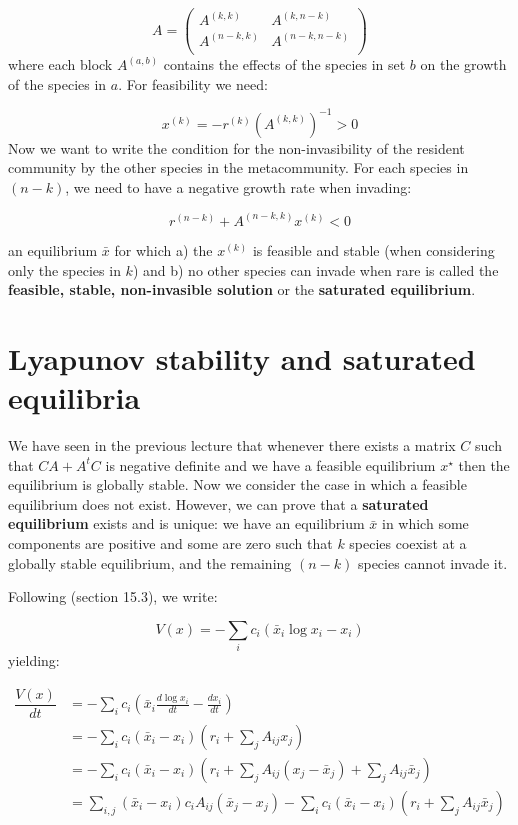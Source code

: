 \documentclass[
]{book}
\begin{document}
\[
A = \begin{pmatrix}
A^{(k,k)} & A^{(k, n- k)}\\
A^{(n-k,k)} & A^{(n-k, n- k)}\\
  \end{pmatrix}
\]
where each block \(A^{(a,b)}\) contains the effects of the species in set \(b\) on the growth of the species in \(a\). For feasibility we need:

\[
x^{(k)} = -r^{(k)}\left(A^{(k,k)} \right)^{-1} > 0
\]
Now we want to write the condition for the non-invasibility of the resident community by the other species in the metacommunity. For each species in \((n-k)\), we need to have a negative growth rate when invading:

\[
r^{(n-k)} + A^{(n-k,k)}x^{(k)} < 0
\]

an equilibrium \(\bar{x}\) for which a) the \(x^{(k)}\) is feasible and stable (when considering only the species in \(k\)) and b) no other species can invade when rare is called the \textbf{feasible, stable, non-invasible solution} or the \textbf{saturated equilibrium}.

\hypertarget{lyapunov-stability-and-saturated-equilibria}{%
\section{Lyapunov stability and saturated equilibria}\label{lyapunov-stability-and-saturated-equilibria}}

We have seen in the previous lecture that whenever there exists a matrix \(C\) such that \(CA + A^t C\) is negative definite and we have a feasible equilibrium \(x^\star\) then the equilibrium is globally stable. Now we consider the case in which a feasible equilibrium does not exist. However, we can prove that a \textbf{saturated equilibrium} exists and is unique: we have an equilibrium \(\bar{x}\) in which some components are positive and some are zero such that \(k\) species coexist at a globally stable equilibrium, and the remaining \((n-k)\) species cannot invade it.

Following \citet{hofbauer1998evolutionary} (section 15.3), we write:

\[
V(x) = -\sum_i c_i (\bar{x}_i \log x_i - x_i)
\]
yielding:

\[
\begin{aligned}
\dfrac{V(x)}{dt} &= -\sum_i c_i \left(\bar{x}_i \frac{d \log x_i}{dt} - \frac{d x_i}{dt} \right) \\
&= -\sum_i c_i \left( \bar{x}_i - x_i \right)  \left( r_i + \sum_j A_{ij} x_j \right) \\
&= -\sum_i c_i \left( \bar{x}_i - x_i \right)  \left( r_i + \sum_j A_{ij} (x_j - \bar{x}_j) +  \sum_j A_{ij} \bar{x}_j \right) \\
&= \sum_{i,j} \left( \bar{x}_i - x_i \right) c_i A_{ij} \left( \bar{x}_j - x_j \right) - \sum_i c_i \left( \bar{x}_i - x_i \right) \left(r_i + \sum_j A_{ij} \bar{x}_j \right)
\end{aligned}
\]
\end{document}
